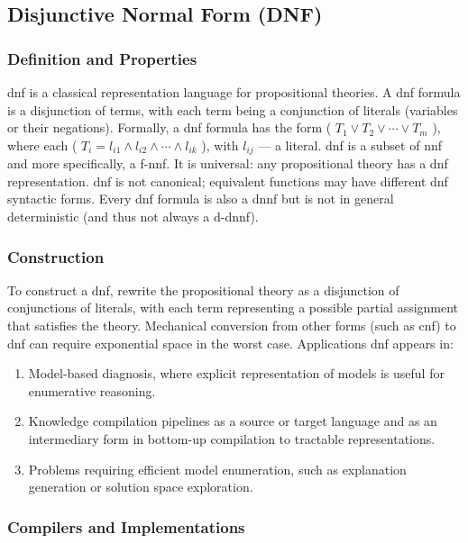 \subsection{Disjunctive Normal Form (DNF)}
\label{sec:event_trees_as_2_lvl_circuits}

\subsubsection{Definition and Properties}
\acrfull{dnf} is a classical representation language for propositional theories. A \acrshort{dnf} formula is a disjunction of terms, with each term being a conjunction of literals (variables or their negations). Formally, a \acrshort{dnf} formula has the form ( $T_1 \vee T_2 \vee \cdots \vee T_m$ ), where each ( $T_i = l_{i1} \wedge l_{i2} \wedge \cdots \wedge l_{ik}$ ), with $l_{ij}$ --- a literal. \acrshort{dnf} is a subset of \acrshort{nnf} and more specifically, a \acrfull{f-nnf}. It is universal: any propositional theory has a \acrshort{dnf} representation. \acrshort{dnf} is not canonical; equivalent functions may have different \acrshort{dnf} syntactic forms. Every \acrshort{dnf} formula is also a \acrshort{dnnf} but is not in general deterministic (and thus not always a \acrshort{d-dnnf}).

\subsubsection{Construction}
To construct a \acrshort{dnf}, rewrite the propositional theory as a disjunction of conjunctions of literals, with each term representing a possible partial assignment that satisfies the theory. Mechanical conversion from other forms (such as  \acrshort{cnf}) to \acrshort{dnf} can require exponential space in the worst case.
Applications \acrshort{dnf} appears in:
\begin{enumerate}
\item Model-based diagnosis, where explicit representation of models is useful for enumerative reasoning.
\item Knowledge compilation pipelines as a source or target language and as an intermediary form in bottom-up compilation to tractable representations.
\item Problems requiring efficient model enumeration, such as explanation generation or solution space exploration.
\end{enumerate}

\subsubsection{Compilers and Implementations}

